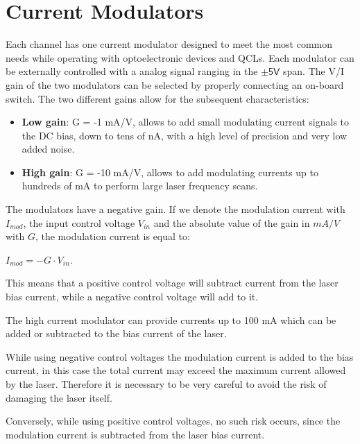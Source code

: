 \section{Current Modulators}
Each channel has one current modulator designed to meet the most common needs while operating with optoelectronic devices and QCLs. Each modulator can be externally controlled with a analog signal ranging in the $\mathsf{\pm5 V}$ span. The V/I gain of the two modulators can be selected by properly connecting an on-board switch. \newline
The two different gains allow for the subsequent characteristics:
\begin{itemize}

\item\textbf{Low gain}: G = -1 mA/V, allows to add small modulating current signals to the DC bias, down to tens of nA, with a high level of precision and very low added noise.
\item\textbf{High gain}: G = -10 mA/V, allows to add modulating currents up to hundreds of mA to perform large laser frequency scans.

\end{itemize}
The modulators have a negative gain. If we denote the modulation current with $I_{mod}$, the input control voltage $V_{in}$ and the absolute value of the gain in $mA/V$ with $G$, the modulation current is equal to:

\begin{center}
    $I_{mod} = -G \cdot V_{in}$.
\end{center}

This means that a positive control voltage will subtract current from the laser bias current, while a negative control voltage will add to it.

\begin{tcolorbox}[enhanced,attach boxed title to top center={yshift=-3mm,yshifttext=-1mm},
  colback=black!5!white,colframe=red!75!black,colbacktitle=red!80!black,
  title=CAUTION,fonttitle=\bfseries,
  boxed title style={size=small,colframe=black!50!black} ]

The high current modulator can provide currents up to 100 mA which can be added or subtracted to the bias current of the laser.

While using negative control voltages the modulation current is added to the bias current, in this case the total current may exceed the maximum current allowed by the laser. Therefore it is necessary to be very careful to avoid the risk of damaging the laser itself.

Conversely, while using positive control voltages, no such risk occurs, since the modulation current is subtracted from the laser bias current.

\end{tcolorbox}